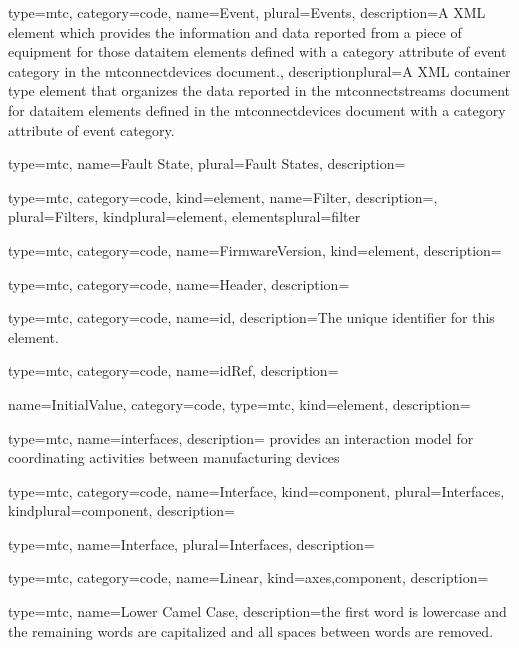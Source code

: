 {
  type=mtc,
  category=code,
  name={Event},
  plural={Events},
  description={A XML element which provides the information and data reported from a piece of equipment for those \gls{dataitem} elements defined with a \gls{category} attribute of \gls{event category} in the \glspl{mtconnectdevice} document.},
  descriptionplural={A XML container type element that organizes the data reported in the \glspl{mtconnectstream} document for \gls{dataitem} elements defined in the \glspl{mtconnectdevice} document with a \gls{category} attribute of \gls{event category}.}
}


{
  type=mtc,
  name={Fault State},
  plural={Fault States},
  description={}
}


{
  type=mtc,
  category=code,
  kind={element},
  name={Filter},
  description={},
  plural={Filters},
  kindplural={element},
  elementsplural={\gls{filter}}
}


{
  type=mtc,
  category=code,
  name={FirmwareVersion},
  kind={element},
  description={}
}


{
  type=mtc,
  category=code,
  name={Header},
  description={}
}


{
  type=mtc,
  category=code,
  name={id},
  description={The unique identifier for this element.}
}


{
  type=mtc,
  category=code,
  name={idRef},
  description={}
}


{
  name={InitialValue},
  category=code,
  type=mtc,
  kind={element},
  description={}
}


{
  type=mtc,
  name=interfaces,
  description={ provides an interaction model for coordinating activities between manufacturing devices}
}


{
  type=mtc,
  category=code,
  name={Interface},
  kind={component},
  plural={Interfaces},
  kindplural={component},
  description={}
}


{
  type=mtc,
  name={Interface},
  plural={Interfaces},
  description={}
}


{
  type=mtc,
  category=code,
  name={Linear},
  kind={axes,component},
  description={}
}


{
  type=mtc,
  name={Lower Camel Case},
  description={the first word is lowercase and the remaining words are capitalized and all spaces between words are removed.}
}


